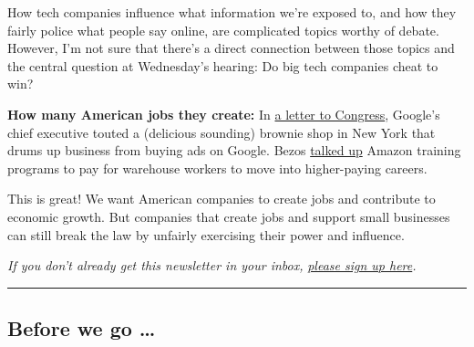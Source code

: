 How tech companies influence what information we're exposed to, and how
they fairly police what people say online, are complicated topics worthy
of debate. However, I'm not sure that there's a direct connection
between those topics and the central question at Wednesday's hearing: Do
big tech companies cheat to win?

\textbf{How many American jobs they create:} In
\href{https://docs.house.gov/meetings/JU/JU05/20200729/110883/HHRG-116-JU05-Wstate-PichaiS-20200729.pdf}{a
letter to Congress}, Google's chief executive touted a (delicious
sounding) brownie shop in New York that drums up business from buying
ads on Google. Bezos
\href{https://docs.house.gov/meetings/JU/JU05/20200729/110883/HHRG-116-JU05-Wstate-BezosJ-20200729.pdf}{talked
up} Amazon training programs to pay for warehouse workers to move into
higher-paying careers.

This is great! We want American companies to create jobs and contribute
to economic growth. But companies that create jobs and support small
businesses can still break the law by unfairly exercising their power
and influence.

\emph{If you don't already get this newsletter in your inbox,}
\href{https://www.nytimes3xbfgragh.onion/newsletters/signup/OT}{\emph{please
sign up here}}\emph{.}

\begin{center}\rule{0.5\linewidth}{\linethickness}\end{center}

\hypertarget{before-we-go-}{%
\subsection{Before we go \ldots{}}\label{before-we-go-}}

